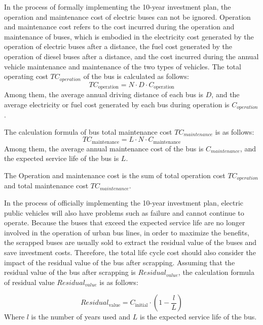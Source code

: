 \documentclass[12pt]{article}
\begin{document}

In the process of formally implementing the 10-year investment plan, the operation and maintenance cost of electric buses can not be ignored. Operation and maintenance cost refers to the cost incurred during the operation and maintenance of buses, which is embodied in the electricity cost generated by the operation of electric buses after a distance, the fuel cost generated by the operation of diesel buses after a distance, and the cost incurred during the annual vehicle maintenance and maintenance of the two types of vehicles.
The total operating cost $TC_{operation}$ of the bus is calculated as follows:
\begin{equation}
    TC_{\text{operation}} = N \cdot D \cdot C_{\text{operation}} 
\end{equation}
Among them, the average annual driving distance of each bus is $D$, and the average electricity or fuel cost generated by 
each bus during operation is $C_{operation}$.

The calculation formula of bus total maintenance cost $TC_{maintenance}$ is as follows:
\begin{equation}
    TC_{\text{maintenance}} = L \cdot N \cdot C_{\text{maintenance}} 
\end{equation}
Among them, the average annual maintenance cost of the bus is $C_{maintenance}$, and the expected service life of the bus is $L$.

The Operation and maintenance cost is the sum of total operation cost $TC_{operation}$ and total maintenance cost $TC_{maintenance}$.

In the process of officially implementing the 10-year investment plan, electric public vehicles will also have problems such as 
failure and cannot continue to operate. Because the buses that exceed the expected service life are no longer involved in the operation 
of urban bus lines, in order to maximize the benefits, the scrapped buses are usually sold to extract the residual value of the buses 
and save investment costs. Therefore, the total life cycle cost should also consider the impact of the residual value of the bus after 
scrapping. Assuming that the residual value of the bus after scrapping is $Residual_{value}$, the calculation formula of residual value 
$Residual_{value}$ is as follows:

\begin{equation}
    Residual_{\text{value}}=C_{\text{initial}} \cdot \left(1-\frac{l}{L}\right)
\end{equation}
Where $l$ is the number of years used and $L$ is the expected service life of the bus.
\end{document}
